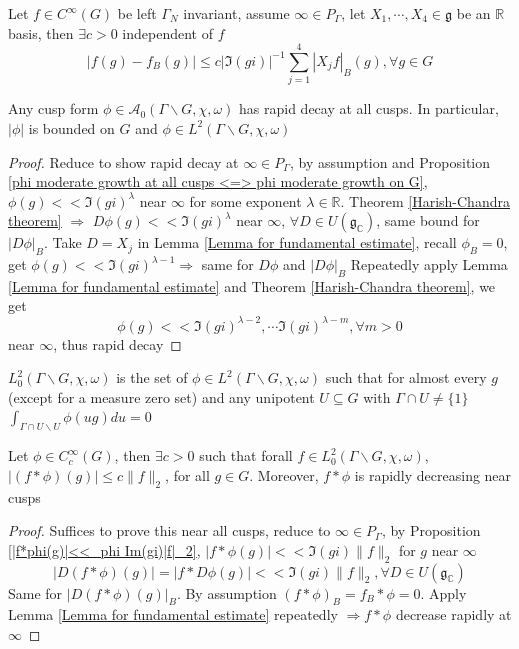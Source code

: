 \documentclass[../main.tex]{subfiles}
\begin{document}
\begin{lemma}\label{Lemma for fundamental estimate}
Let $f\in C^\infty(G)$ be left $\Gamma_N$ invariant, assume $\infty\in P_\Gamma$, let $X_1,\cdots,X_4\in\mathfrak g$ be an $\mathbb R$ basis, then $\exists c>0$ independent of $f$
\[|f(g)-f_B(g)|\leq c|\Im (gi)|^{-1}\sum_{j=1}^4|X_jf|_B(g),\forall g\in G\]
\end{lemma}

\begin{corollary}\label{A_0 subseteq L^2}
Any cusp form $\phi\in\mathcal A_0(\Gamma\backslash G,\chi,\omega)$ has rapid decay at all cusps. In particular, $|\phi|$ is bounded on $G$ and $\phi\in L^2(\Gamma\backslash G,\chi,\omega)$
\end{corollary}

\begin{proof}
Reduce to show rapid decay at $\infty\in P_\Gamma$, by assumption and Proposition \ref{phi moderate growth at all cusps <=> phi moderate growth on G}, $\phi(g)<< \Im(gi)^\lambda$ near $\infty$ for some exponent $\lambda\in\mathbb R$. Theorem \ref{Harish-Chandra theorem} $\Rightarrow$ $D\phi(g)<< \Im(gi)^\lambda$ near $\infty$, $\forall D\in U(\mathfrak g_{\mathbb C})$, same bound for $|D\phi|_B$. Take $D=X_j$ in Lemma \ref{Lemma for fundamental estimate}, recall $\phi_B=0$, get $\phi(g)<<\Im(gi)^{\lambda-1}\Rightarrow$ same for $D\phi$ and $|D\phi|_B$
Repeatedly apply Lemma \ref{Lemma for fundamental estimate} and Theorem \ref{Harish-Chandra theorem}, we get 
\[\phi(g)<<\Im(gi)^{\lambda-2},\cdots \Im(gi)^{\lambda-m},\forall m>0\]
near $\infty$, thus rapid decay
\end{proof}

\begin{definition}
$L^2_0(\Gamma\backslash G,\chi,\omega)$ is the set of $\phi\in L^2(\Gamma\backslash G,\chi,\omega)$ such that for almost every $g$(except for a measure zero set) and any unipotent $U\subseteq G$ with $\Gamma\cap U\neq\{1\}$
$\int_{\Gamma\cap U\backslash U}\phi(ug)du=0$
\end{definition}

\begin{corollary}\label{f in L_0^2, |f*g(g)|<=c|f|_2}
Let $\phi\in C^\infty_c(G)$, then $\exists c>0$ such that forall $f\in L^2_0(\Gamma\backslash G,\chi,\omega)$, $|(f*\phi)(g)|\leq c\|f\|_2$, for all $g\in G$. Moreover, $f*\phi$ is rapidly decreasing near cusps
\end{corollary}

\begin{proof}
Suffices to prove this near all cusps, reduce to $\infty\in P_\Gamma$, by Proposition \ref{|f*phi(g)|<<_phi Im(gi)|f|_2}, $|f*\phi(g)|<<\Im(gi)\|f\|_2$ for $g$ near $\infty$
\[|D(f*\phi)(g)|=|f*D\phi(g)|<<\Im(gi)\|f\|_2,\forall D\in U(\mathfrak g_{\mathbb C})\]
Same for $|D(f*\phi)(g)|_B$. By assumption $(f*\phi)_B=f_B*\phi=0$. Apply Lemma \ref{Lemma for fundamental estimate} repeatedly $\Rightarrow f*\phi$ decrease rapidly at $\infty$
\end{proof}
\end{document}

